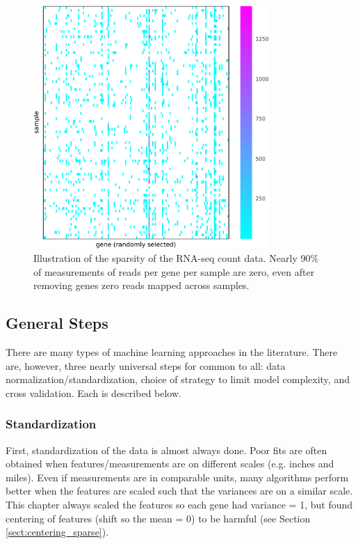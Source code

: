 \begin{figure}[H]
\centering
    \includegraphics[width=0.8\textwidth]{./tex/chapter3/figures/20170403_sparsity_illustration--754836_nonzero_features.pdf}
    \begin{singlespace}
    \caption[Illustration of the sparsity of the RNA-seq count data]{
        Illustration of the sparsity of the RNA-seq count data.
        Nearly 90\% of measurements of reads per gene per sample are zero, even after removing genes zero reads mapped across samples.
        }
    \label{fig:sparse_RNA-seq}
    \end{singlespace}
\end{figure}


\subsection{General Steps}

There are many types of machine learning approaches in the literature.
There are, however, three nearly universal steps for common to all: data normalization/standardization, choice of strategy to limit model complexity, and cross validation.
Each is described below.

\subsubsection{Standardization}
First, standardization of the data is almost always done.
Poor fits are often obtained when features/measurements are on different scales (e.g. inches and miles).
Even if measurements are in comparable units, many algorithms perform better when the features are scaled such that the variances are on a similar scale.
This chapter always scaled the features so each gene had variance = 1, but found centering of features (shift so the mean = 0) to be harmful (see Section \ref{sect:centering_sparse}).

